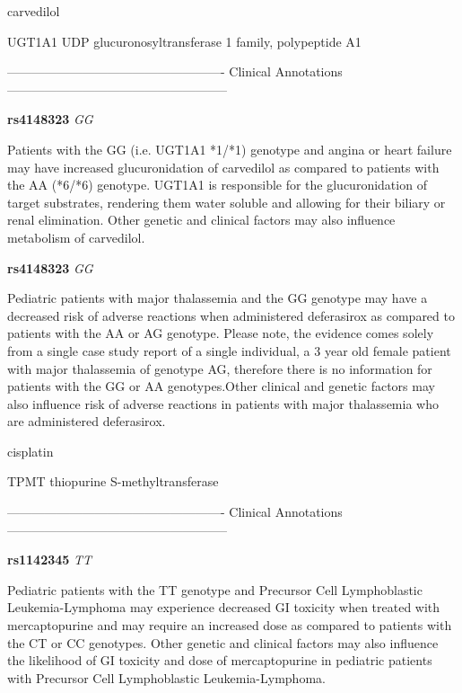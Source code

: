 \documentclass{resume} %
\begin{document}
\begin{rSection}{ carvedilol }
\begin{rSubsection}{ UGT1A1 }{ UDP glucuronosyltransferase 1 family, polypeptide A1 }{}{}
\item[] ---------------------------------------------------- Clinical Annotations -----------------------------------------------------\newline
\item \textbf{ rs4148323 } \textit{ GG }
\item[] Patients with the GG (i.e. UGT1A1 *1/*1) genotype and angina or heart failure may have increased glucuronidation of carvedilol as compared to patients with the AA (*6/*6) genotype. UGT1A1 is responsible for the glucuronidation of target substrates, rendering them water soluble and allowing for their biliary or renal elimination. Other genetic and clinical factors may also influence metabolism of carvedilol.\item \textbf{ rs4148323 } \textit{ GG }
\item[] Pediatric patients with major thalassemia and the GG genotype may have a decreased risk of adverse reactions when administered deferasirox as compared to patients with the AA or AG genotype. Please note, the evidence comes solely from a single case study report of a single individual, a 3 year old female patient with major thalassemia of genotype AG, therefore there is no information for patients with the GG or AA genotypes.Other clinical and genetic factors may also influence risk of adverse reactions in patients with major thalassemia who are administered deferasirox.
\end{rSubsection}

\end{rSection}\begin{rSection}{ cisplatin }
\item[]

\begin{rSubsection}{ TPMT }{ thiopurine S-methyltransferase }{}{}
\item[]

\item[] ---------------------------------------------------- Clinical Annotations -----------------------------------------------------\newline
\item \textbf{ rs1142345 } \textit{ TT }
\item[] Pediatric patients with the TT genotype and Precursor Cell Lymphoblastic Leukemia-Lymphoma may experience decreased GI toxicity when treated with mercaptopurine and may require an increased dose as compared to patients with the CT or CC genotypes. Other genetic and clinical factors may also influence the likelihood of GI toxicity and dose of mercaptopurine in pediatric patients with Precursor Cell Lymphoblastic Leukemia-Lymphoma.
\end{rSubsection}


\end{rSection}
\end{document}
